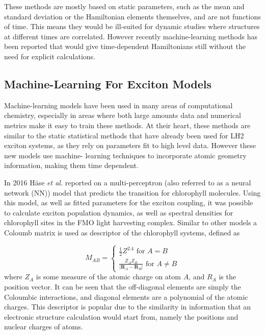 These methods are mostly based on static parameters, such as the mean and standard
deviation or the Hamiltonian elements themselves, and are not functions of time.
This means they would be ill-suited for dynamic studies where structures at different
times are correlated. However recently machine-learning methods has been reported
that would give time-dependent Hamiltonians still without the need for explicit
calculations.

\subsection{Machine-Learning For Exciton Models}
\label{subsec:machine_learning} 

Machine-learning models have been used in many areas of computational chemistry,
especially in areas where both large amounts data and numerical metrics make it 
easy to train these methods. At their heart, these methods are similar to the static
statistical methods that have already been used for LH2 exciton systems, as they
rely on parameters fit to high level data. However these new models use machine-
learning techniques to incorporate atomic geometry information, making them time
dependent.

In 2016 H\"{a}se \emph{et al.} reported on a multi-perceptron (also referred to
as a neural network (NN)) model that predicts the \Qy transition for chlorophyll
molecules. Using this model, as well as fitted parameters for the exciton coupling,
it was possible to calculate exciton population dynamics, as well as spectral densities
for chlorophyll sites in the FMO light harvesting complex. Similar to other models
a Coloumb matrix is used as descriptor of the chlorophyll systems, defined as 

\begin{equation}
	M_{AB} = 
	  \begin{cases}
		\frac{1}{2} Z^{2.4} \text{ for } A = B\\
		\frac{Z_A Z_B}{\left\lvert \mathbf{R}_A - \mathbf{R}_B\right\rvert} \text{ for } A \neq B
	  \end{cases}
\end{equation}
%
where $Z_A$ is some measure of the atomic charge on atom $A$, and $R_A$ is the position
vector. It can be seen that the off-diagonal elements are simply the Coloumbic interactions,
and diagonal elements are a polynomial of the atomic charges. This descriptor is
popular due to the similarity in information that an electronic structure calculation
would start from, namely the positions and nuclear charges of atoms.

